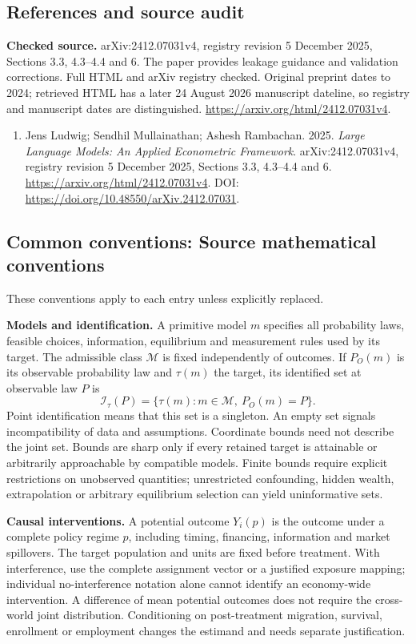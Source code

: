 \documentclass[11pt,a4paper]{article}
\begin{document}
\subsection*{References and source audit}
\textbf{Checked source.} arXiv:2412.07031v4, registry revision 5 December 2025, Sections 3.3, 4.3--4.4 and 6. The paper provides leakage guidance and validation corrections. Full HTML and arXiv registry checked. Original preprint dates to 2024; retrieved HTML has a later 24 August 2026 manuscript dateline, so registry and manuscript dates are distinguished. \url{https://arxiv.org/html/2412.07031v4}.
\begin{enumerate}\raggedright
\item\hypertarget{definitions:source:30007709:1}{} Jens Ludwig; Sendhil Mullainathan; Ashesh Rambachan. 2025. \emph{Large Language Models: An Applied Econometric Framework}. arXiv:2412.07031v4, registry revision 5 December 2025, Sections 3.3, 4.3--4.4 and 6.
\url{https://arxiv.org/html/2412.07031v4}.
DOI: \url{https://doi.org/10.48550/arXiv.2412.07031}.
\end{enumerate}

\subsection*{Common conventions: Source mathematical conventions}

These conventions apply to each entry unless explicitly replaced.

\textbf{Models and identification.} A primitive model \(m\) specifies all probability laws, feasible choices, information, equilibrium and measurement rules used by its target. The admissible class \(\mathcal M\) is fixed independently of outcomes. If \(P_O(m)\) is its observable probability law and \(\tau(m)\) the target, its identified set at observable law \(P\) is
\[
 \mathcal I_\tau(P)=\{\tau(m):m\in\mathcal M,\ P_O(m)=P\}.
\]
Point identification means that this set is a singleton. An empty set signals incompatibility of data and assumptions. Coordinate bounds need not describe the joint set. Bounds are sharp only if every retained target is attainable or arbitrarily approachable by compatible models. Finite bounds require explicit restrictions on unobserved quantities; unrestricted confounding, hidden wealth, extrapolation or arbitrary equilibrium selection can yield uninformative sets.

\textbf{Causal interventions.} A potential outcome \(Y_i(p)\) is the outcome under a complete policy regime \(p\), including timing, financing, information and market spillovers. The target population and units are fixed before treatment. With interference, use the complete assignment vector or a justified exposure mapping; individual no-interference notation alone cannot identify an economy-wide intervention. A difference of mean potential outcomes does not require the cross-world joint distribution. Conditioning on post-treatment migration, survival, enrollment or employment changes the estimand and needs separate justification.
\end{document}
